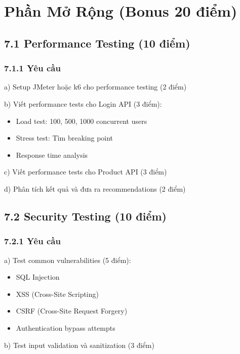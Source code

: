 \documentclass[a4paper,12pt]{article}
\begin{document}
\section{Phần Mở Rộng (Bonus 20 điểm)}

\subsection{7.1 Performance Testing (10 điểm)}

\subsubsection{7.1.1 Yêu cầu}

a) Setup JMeter hoặc k6 cho performance testing (2 điểm)

b) Viết performance tests cho Login API (3 điểm):

\begin{itemize}
    \item Load test: 100, 500, 1000 concurrent users
    \item Stress test: Tìm breaking point
    \item Response time analysis
\end{itemize}

c) Viết performance tests cho Product API (3 điểm)

d) Phân tích kết quả và đưa ra recommendations (2 điểm)

\subsection{7.2 Security Testing (10 điểm)}

\subsubsection{7.2.1 Yêu cầu}

a) Test common vulnerabilities (5 điểm):

\begin{itemize}
    \item SQL Injection
    \item XSS (Cross-Site Scripting)
    \item CSRF (Cross-Site Request Forgery)
    \item Authentication bypass attempts
\end{itemize}

b) Test input validation và sanitization (3 điểm)
\end{document}
